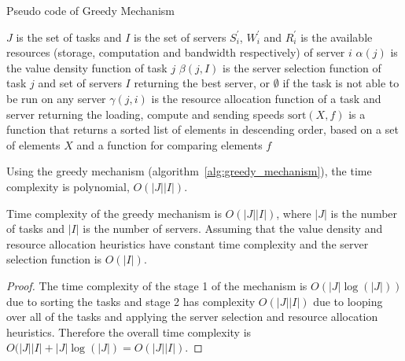 \begin{algorithm}
    \caption{Pseudo code of Greedy Mechanism}
    \label{alg:greedy_mechanism}
    \begin{algorithmic}
        \REQUIRE $J$ is the set of tasks and $I$ is the set of servers
        \REQUIRE $S^{'}_i$, $W^{'}_i$ and $R^{'}_i$ is the available resources (storage, computation and bandwidth respectively) of server $i$
        \REQUIRE $\alpha(j)$ is the value density function of task $j$
        \REQUIRE $\beta(j, I)$ is the server selection function of task $j$ and set of servers $I$ returning the best server, or $\emptyset$ if the task is not able to be run on any server
        \REQUIRE $\gamma(j, i)$ is the resource allocation function of a task and server returning the loading, compute and sending speeds
        \REQUIRE $\text{sort}(X, f)$ is a function that returns a sorted list of elements in descending order, based on a set of elements $X$ and a function for comparing elements $f$

        \ENDIF
        \ENDFOR
    \end{algorithmic}
\end{algorithm}

Using the greedy mechanism (algorithm~\ref{alg:greedy_mechanism}), the time complexity is polynomial,
$O(\left|J\right| \left|I\right|)$.
\begin{theorem}
    Time complexity of the greedy mechanism is $O(\left|J\right| \left|I\right|)$, where $\left|J\right|$ is the number
    of tasks and $\left|I\right|$ is the number of servers. Assuming that the value density and resource allocation
    heuristics have constant time complexity and the server selection function is $O(\left|I\right|)$.
\end{theorem}
\begin{proof}
    The time complexity of the stage 1 of the mechanism is $O(\left|J\right| \log(\left|J\right|))$ due to sorting the
    tasks and stage 2 has complexity $O(\left|J\right| \left|I\right|)$ due to looping over all of the tasks and
    applying the server selection and resource allocation heuristics. Therefore the overall time complexity is
    $O(\left|J\right| \left|I\right| + \left|J\right| \log(\left|J\right|) = O(\left|J\right| \left|I\right|)$.
\end{proof}

